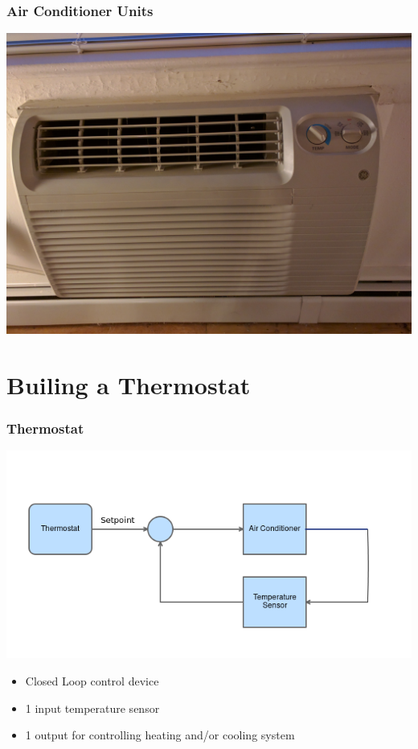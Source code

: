 \documentclass[aspectratio=169,11pt,hyperref={colorlinks=true}]{beamer}
\begin{document}
\begin{frame}
    \frametitle{Air Conditioner Units}
    \begin{center}
        \includegraphics[width=.75\textwidth]{AC_unit.jpeg}
    \end{center}
\end{frame}

\section{Builing a Thermostat}

\begin{frame}
    \frametitle{Thermostat}
    \begin{center}
    \includegraphics[width=.8\textwidth]{flowchart.png}
    \end{center}
    \begin{itemize}
        \item Closed Loop control device
        \item 1 input temperature sensor
        \item 1 output for controlling heating and/or cooling system
    \end{itemize}
\end{frame}
\end{document}
